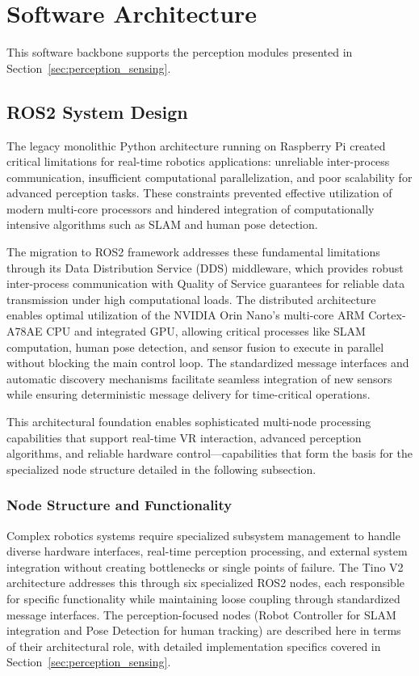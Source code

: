 
\section{Software Architecture}
\label{sec:software_arch}

This software backbone supports the perception modules presented in Section~\ref{sec:perception_sensing}.

\subsection{ROS2 System Design}

The legacy monolithic Python architecture running on Raspberry Pi created critical limitations for real-time robotics applications: unreliable inter-process communication, insufficient computational parallelization, and poor scalability for advanced perception tasks. These constraints prevented effective utilization of modern multi-core processors and hindered integration of computationally intensive algorithms such as SLAM and human pose detection.

The migration to ROS2 framework addresses these fundamental limitations through its Data Distribution Service (DDS) middleware, which provides robust inter-process communication with Quality of Service guarantees for reliable data transmission under high computational loads. The distributed architecture enables optimal utilization of the NVIDIA Orin Nano's multi-core ARM Cortex-A78AE CPU and integrated GPU, allowing critical processes like SLAM computation, human pose detection, and sensor fusion to execute in parallel without blocking the main control loop. The standardized message interfaces and automatic discovery mechanisms facilitate seamless integration of new sensors while ensuring deterministic message delivery for time-critical operations.

This architectural foundation enables sophisticated multi-node processing capabilities that support real-time VR interaction, advanced perception algorithms, and reliable hardware control—capabilities that form the basis for the specialized node structure detailed in the following subsection.

\subsubsection{Node Structure and Functionality}

Complex robotics systems require specialized subsystem management to handle diverse hardware interfaces, real-time perception processing, and external system integration without creating bottlenecks or single points of failure. The Tino V2 architecture addresses this through six specialized ROS2 nodes, each responsible for specific functionality while maintaining loose coupling through standardized message interfaces. The perception-focused nodes (Robot Controller for SLAM integration and Pose Detection for human tracking) are described here in terms of their architectural role, with detailed implementation specifics covered in Section~\ref{sec:perception_sensing}.

